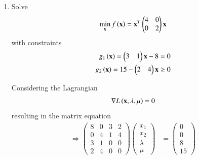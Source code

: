 \renewcommand{\theequation}{\theenumi}
\begin{enumerate}[label=\arabic*.,ref=\thesubsection.\theenumi]

\item
Solve
 \begin{align}
 \label{ch2_kkt_problem}
\min_{\mathbf{x}} f\left(\mathbf{x}\right) = \mathbf{x}^T\begin{pmatrix}4 & 0 \\0 & 2\end{pmatrix}\mathbf{x}
 \end{align}
 with constraints
 \begin{align}
 g_1\left(\mathbf{x}\right) = \begin{pmatrix}3 & 1\end{pmatrix}\mathbf{x}-8 = 0\\
 g_2 \left(\mathbf{x}\right)= 15 - \begin{pmatrix}2 & 4\end{pmatrix}\mathbf{x} \geq 0
 \end{align}
 
%
\solution Considering the Lagrangian
%
\begin{align}
 \nabla L\brak{\mbf{x},\lambda, \mu}  %
= 0
\end{align}
%
resulting in the matrix equation
%
\begin{align}
\Rightarrow 
\begin{pmatrix}
8 &0 & 3 & 2\\
0 &4 & 1 & 4 \\
3 & 1 & 0 &0  \\
2 & 4 & 0 & 0
\end{pmatrix}
\begin{pmatrix}
x_1 \\
x_2 \\
\lambda
\\
\mu
\end{pmatrix}
&=
\begin{pmatrix}
0 \\
0 \\
8 \\
15
\end{pmatrix}
\\

\end{align}
\end{enumerate}
